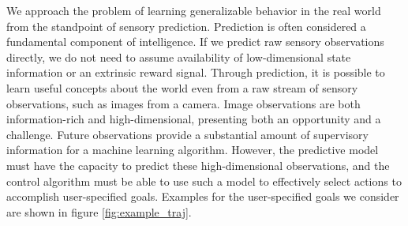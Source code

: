 We approach the problem of learning generalizable behavior in the real world from the standpoint of sensory prediction. Prediction is often considered a fundamental component of intelligence. If we predict raw sensory observations directly, we do not need to assume availability of low-dimensional state information or an extrinsic reward signal. Through prediction, it is possible to learn useful concepts about the world even from a raw stream of sensory observations, such as images from a camera. Image observations are both information-rich and high-dimensional, presenting both an opportunity and a challenge. Future observations provide a substantial amount of supervisory information for a machine learning algorithm. However, the predictive model must have the capacity to predict these high-dimensional observations, and the control algorithm must be able to use such a model to effectively select actions to accomplish user-specified goals.  Examples for the user-specified goals we consider are shown in figure \ref{fig:example_traj}.


